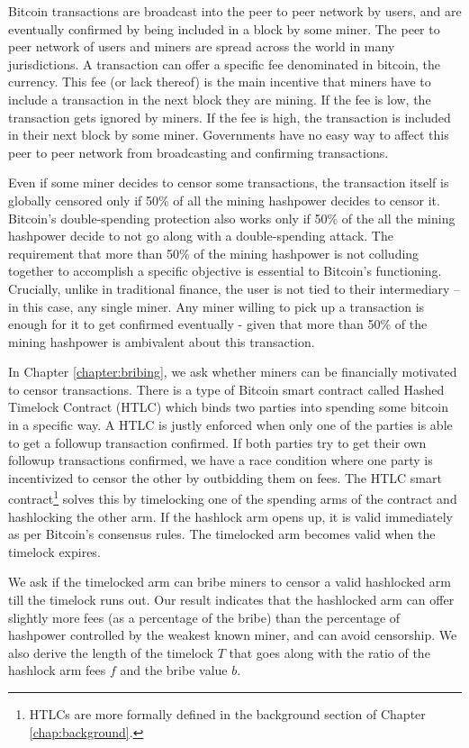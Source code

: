 Bitcoin transactions are broadcast into the peer to peer network by users, and are eventually confirmed by being included in a block by some miner. The peer to peer network of users and miners are spread across the world in many jurisdictions. A transaction can offer a specific fee denominated in bitcoin, the currency. This fee (or lack thereof) is the main incentive that miners have to include a transaction in the next block they are mining. If the fee is low, the transaction gets ignored by miners. If the fee is high, the transaction is included in their next block by some miner. Governments have no easy way to affect this peer to peer network from broadcasting and confirming transactions.

Even if some miner decides to censor some transactions, the transaction itself is globally censored only if 50\% of all the mining hashpower decides to censor it. Bitcoin's double-spending protection also works only if 50\% of the all the mining hashpower decide to not go along with a double-spending attack. The requirement that more than 50\% of the mining hashpower is not colluding together to accomplish a specific objective is essential to Bitcoin's functioning. Crucially, unlike in traditional finance, the user is not tied to their intermediary -- in this case, any single miner. Any miner willing to pick up a transaction is enough for it to get confirmed eventually - given that more than 50\% of the mining hashpower is ambivalent about this transaction.

In Chapter \ref{chapter:bribing}, we ask whether miners can be financially motivated to censor transactions. There is a type of Bitcoin smart contract called Hashed Timelock Contract (HTLC) which binds two parties into spending some bitcoin in a specific way. A HTLC is justly enforced when only one of the parties is able to get a followup transaction confirmed. If both parties try to get their own followup transactions confirmed, we have a race condition where one party is incentivized to censor the other by outbidding them on fees. The HTLC smart contract\footnote{HTLCs are more formally defined in the background section of Chapter \ref{chap:background}.} solves this by timelocking one of the spending arms of the contract and hashlocking the other arm. If the hashlock arm opens up, it is valid immediately as per Bitcoin's consensus rules. The timelocked arm becomes valid when the timelock expires. 

We ask if the timelocked arm can bribe miners to censor a valid hashlocked arm till the timelock runs out. Our result indicates that the hashlocked arm can offer slightly more fees (as a percentage of the bribe) than the percentage of hashpower controlled by the weakest known miner, and can avoid censorship. We also derive the length of the timelock $T$ that goes along with the ratio of the hashlock arm fees $f$ and the bribe value $b$.

